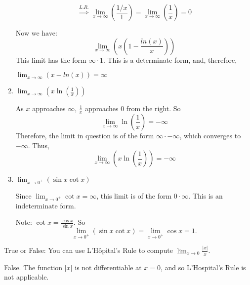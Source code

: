 \documentclass[nooutcomes,handout]{ximera}
\begin{document}
\begin{problem}
\begin{enumerate}
\begin{freeResponse}
      $$\stackrel{L.R.}{\implies} \lim_{x \to \infty}\left(\frac{1/x}{1}\right)=\lim_{x \to \infty}\left(\frac{1}{x}\right)=0$$
      
      Now we have: 
      $$\lim_{x \to \infty} \left(x\left(1-\frac{ln(x)}{x}\right)\right)$$
      This limit has the form $\infty \cdot 1$.  This is a determinate form, and, therefore,

	 $\lim_{x \to \infty} (x-ln(x)) =\infty$
   
    \end{freeResponse}

  \item  $\lim_{x \to \infty} \left( x \ln \left( \frac{1}{x} \right) \right) $
    \begin{freeResponse}
      As $x$ approaches $\infty$, $\frac{1}{x}$ approaches $0$ from the right.
      So  $$\lim_{x \to \infty} \ln \left( \frac{1}{x} \right) = - \infty $$
      Therefore, the limit in question is of the form $\infty \cdot - \infty$, which converges to $- \infty$.
      Thus, 
      $$ \lim_{x \to \infty} \left( x \ln \left( \frac{1}{x} \right) \right) = - \infty $$
    \end{freeResponse}

  \item  $\lim_{x \to 0^+} (\sin x \cot x ) $
    \begin{freeResponse}
      Since $\lim_{x \to 0^+} \cot x = \infty$, this limit is of the form $0 \cdot \infty$.
      This is an indeterminate form.
      
     Note: $\cot x = \frac{\cos x }{\sin x}$.  So
      $$\lim_{x \to 0^+} (\sin x \cot x ) = \lim_{x \to 0^+} \cos x = 1 .$$
    \end{freeResponse}
  \end{enumerate}
\end{problem}


\begin{problem}

  True or False: You can use L'H\^{o}pital's Rule to compute
  $\lim_{x \to 0} \frac{|x|}{x}$.
  \begin{freeResponse}
    False.
    The function $|x|$ is not differentiable at $x=0$, and so L'Hospital's Rule is not applicable.
  \end{freeResponse}
\end{problem}
\end{document}
